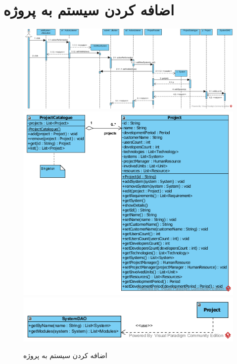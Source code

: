 \section{اضافه کردن سیستم به پروژه}
\begin{figure}[H]
	\centering
	\includegraphics[scale=0.65]{img/sequence-design/AddSystemToProject}
	\includegraphics[scale=0.7]{img/sequence-design/AddSystemToProjectC}
	\includegraphics[scale=0.7]{img/sequence-design/AddSystemToProjectD}
	\caption{اضافه کردن سیستم به پروژه}
\end{figure}

